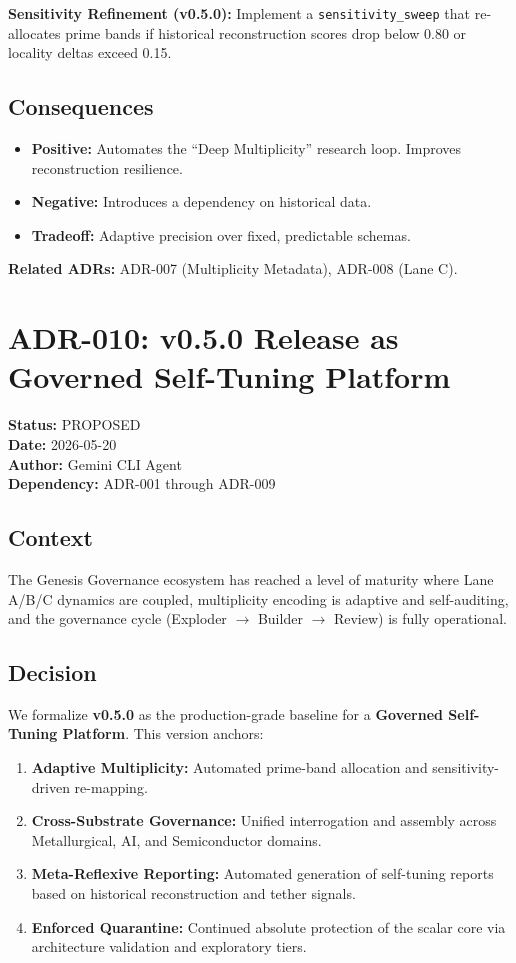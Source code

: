 \documentclass[11pt]{article}
\begin{document}
\textbf{Sensitivity Refinement (v0.5.0):} Implement a \texttt{sensitivity\_sweep} that re-allocates prime bands if historical reconstruction scores drop below 0.80 or locality deltas exceed 0.15.

\subsection{Consequences}
\begin{itemize}
    \item \textbf{Positive:} Automates the ``Deep Multiplicity'' research loop. Improves reconstruction resilience.
    \item \textbf{Negative:} Introduces a dependency on historical data.
    \item \textbf{Tradeoff:} Adaptive precision over fixed, predictable schemas.
\end{itemize}

\textbf{Related ADRs:} ADR-007 (Multiplicity Metadata), ADR-008 (Lane C).

\section{ADR-010: v0.5.0 Release as Governed Self-Tuning Platform}
\textbf{Status:} PROPOSED \\
\textbf{Date:} 2026-05-20 \\
\textbf{Author:} Gemini CLI Agent \\
\textbf{Dependency:} ADR-001 through ADR-009

\subsection{Context}
The Genesis Governance ecosystem has reached a level of maturity where Lane A/B/C dynamics are coupled, multiplicity encoding is adaptive and self-auditing, and the governance cycle (Exploder $\to$ Builder $\to$ Review) is fully operational.

\subsection{Decision}
We formalize \textbf{v0.5.0} as the production-grade baseline for a \textbf{Governed Self-Tuning Platform}. This version anchors:

\begin{enumerate}
    \item \textbf{Adaptive Multiplicity:} Automated prime-band allocation and sensitivity-driven re-mapping.
    \item \textbf{Cross-Substrate Governance:} Unified interrogation and assembly across Metallurgical, AI, and Semiconductor domains.
    \item \textbf{Meta-Reflexive Reporting:} Automated generation of self-tuning reports based on historical reconstruction and tether signals.
    \item \textbf{Enforced Quarantine:} Continued absolute protection of the scalar core via architecture validation and exploratory tiers.
\end{enumerate}
\end{document}
